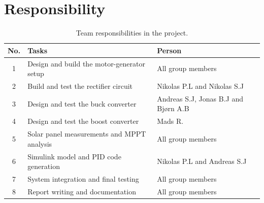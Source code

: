 \ifdefined\mainfile\else\documentclass{article}
\begin{document}
\fi

\section{Responsibility}
\label{sec:Responsability}

\begin{table}[H]
\centering
\caption{Team responsibilities in the project.}
\renewcommand{\arraystretch}{1.2}

\begin{tabular}{|c|p{8cm}|p{5cm}|}
\hline
\textbf{No.} & \textbf{Tasks} & \textbf{Person} \\
\hline
1 & Design and build the motor-generator setup & All group members \\
\hline
2 & Build and test the rectifier circuit & Nikolas P.L and Nikolas S.J \\
\hline
3 & Design and test the buck converter & Andreas S.J, Jonas B.J and Bjørn A.B  \\
\hline
4 & Design and test the boost converter & Mads R. \\
\hline
5 & Solar panel measurements and MPPT analysis & All group members \\
\hline
6 & Simulink model and PID code generation & Nikolas P.L and Andreas S.J\\
\hline
7 & System integration and final testing & All group members \\
\hline
8 & Report writing and documentation & All group members \\
\hline
\end{tabular}

\label{tab:team_responsibilities}
\end{table}


\ifdefined\mainfile\else
\end{document}
